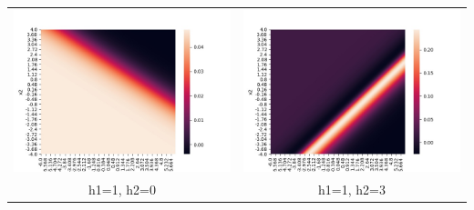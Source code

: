 \documentclass[twoside]{article}
\begin{document}
\begin{tabular}{ cc } 
	\includegraphics[scale=0.5]{heatmaps1/B1_0} & \includegraphics[scale=0.5]{heatmaps1/B1_3} \\ 
	h1=1, h2=0 & h1=1, h2=3 \\ 
\end{tabular}
\end{document}

